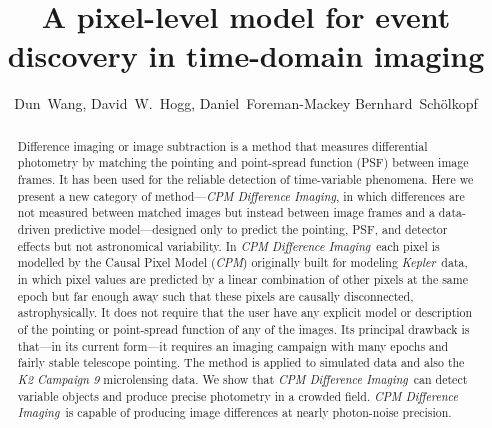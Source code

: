 \documentclass[12pt, preprint]{aastex}
\newcommand{\project}[1]{\textsl{#1}}
\newcommand{\cpm}{\project{CPM}}
\newcommand{\cpmdiff}{\project{CPM Difference Imaging}}
\newcommand{\kepler}{\project{Kepler}}
\begin{document}
\title{A pixel-level model for event discovery in time-domain imaging}
\author{%
  Dun~Wang\altaffilmark{\ref{CCPP},\ref{email}},
  David~W.~Hogg\altaffilmark{\ref{CCPP},\ref{CDS},\ref{MPIA},\ref{FI}},
  Daniel~Foreman-Mackey\altaffilmark{\ref{UW},\ref{SF}}
  Bernhard~Sch\"olkopf\altaffilmark{\ref{MPIIS}}
  }
\setcounter{address}{1}


\begin{abstract}
Difference imaging or image subtraction is a method that measures differential photometry by matching the pointing and point-spread function (PSF) between image frames. 
It has been used for the reliable detection of time-variable phenomena.
Here we present a new category of method---\cpmdiff, in which differences are not measured between matched images but instead between image frames and a data-driven predictive model---designed only to predict the pointing, PSF, and detector effects but not astronomical variability. 
In \cpmdiff\ each pixel is modelled by the Causal Pixel Model (\cpm) originally built for modeling \kepler\ data, in which pixel values are predicted by a linear combination of other pixels at the same epoch but far enough away such that these pixels are causally disconnected, astrophysically. 
It does not require that the user have any explicit model or description of the pointing or point-spread function of any of the images.
Its principal drawback is that---in its current form---it requires an imaging campaign with many epochs and fairly stable telescope pointing.
The method is applied to simulated data and also the \project{K2 Campaign 9} microlensing data. 
We show that \cpmdiff\ can detect variable objects and produce precise photometry in a crowded field.
\cpmdiff\ is capable of producing image differences at nearly photon-noise precision. 
\end{abstract}
\end{document}
